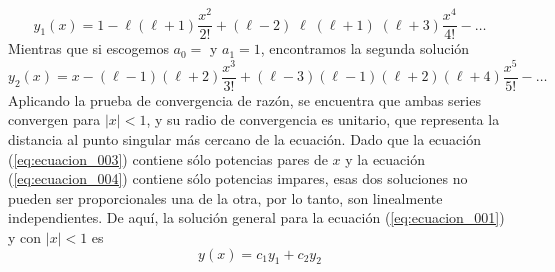 \begin{equation}
y_{1}(x) = 1 - \ell (\ell + 1) \dfrac{x^{2}}{2!} + (\ell - 2)\; \ell \; (\ell + 1)\;(\ell + 3) \dfrac{x^{4}}{4!} - \ldots
\label{eq:ecuacion_003}
\end{equation}
Mientras que si escogemos $a_{0} = $ y $ a_{1} = 1 $, encontramos la segunda solución
\begin{equation}
y_{2}(x) = x - (\ell - 1)(\ell + 2) \dfrac{x^{3}}{3!} + (\ell - 3) (\ell - 1)(\ell + 2)(\ell + 4) \dfrac{x^{5}}{5!} - \ldots
\label{eq:ecuacion_004}
\end{equation}
Aplicando la prueba de convergencia de razón, se encuentra que ambas series convergen para $\vert x \vert < 1$, y su radio de convergencia es unitario, que representa la distancia al punto singular más cercano de la ecuación. Dado que la ecuación (\ref{eq:ecuacion_003}) contiene sólo potencias pares de $x$ y la ecuación (\ref{eq:ecuacion_004}) contiene sólo potencias impares, esas dos soluciones no pueden ser proporcionales una de la otra, por lo tanto, son linealmente independientes. De aquí, la solución general para la ecuación (\ref{eq:ecuacion_001}) y con $\vert x \vert < 1$ es
\[ y(x) = c_{1} y_{1} + c_{2} y_{2} \]
